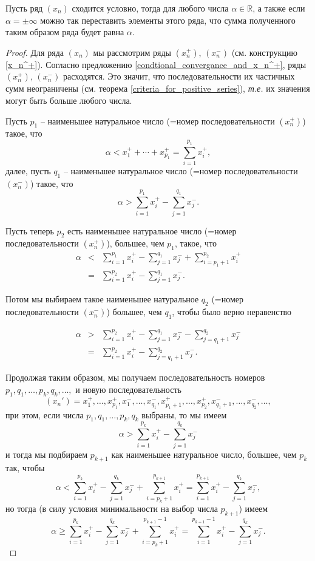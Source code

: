 \begin{theorem}[Риман]
    Пусть ряд $(x_n)$ сходится условно, тогда для любого числа $\alpha \in \mathbb{R}$, а также если $\alpha = \pm \infty$ можно так переставить элементы этого ряда, что сумма полученного таким образом ряда будет равна $\alpha.$
\end{theorem}

\begin{proof}
Для ряда $(x_n)$ мы рассмотрим ряды $(x_n^+)$, $(x_n^-)$ (см. конструкцию \ref{x_n^+}). Согласно предложению \ref{condtional_convergance_and_x_n^+}, ряды $(x_n^+)$, $(x_n^-)$ расходятся. Это значит, что последовательности их частичных сумм неограничены (см. теорема \ref{criteria_for_positive_series}), \textit{т.е.} их значения могут быть больше любого числа. 
    
Пусть $p_1$ -- наименьшее натуральное число (=номер последовательности $(x_n^+)$) такое, что
    \[
     \alpha < x_1^+ + \cdots + x_{p_1}^+  = \sum_{i=1}^{p_1}x_i^+,
    \]
далее, пусть $q_1$ -- наименьшее натуральное число (=номер последовательности $(x_n^-)$) такое, что
\[
 \alpha > \sum_{i=1}^{p_1} x_i^+ - \sum_{j=1}^{q_1} x_j^-.
\]

Пусть теперь $p_2$ есть наименьшее натуральное число (=номер последовательности $(x_n^+)$), большее, чем $p_1$, такое, что
\begin{eqnarray*}
  \alpha &<& \sum_{i=1}^{p_1} x_i^+ - \sum_{j=1}^{q_1} x_j^- + \sum_{i={p_1}+1}^{p_2}x_i^+\\
  &=& \sum_{i=1}^{p_2} x_i^+ - \sum_{j=1}^{q_1} x_j^- .    
\end{eqnarray*}

Потом мы выбираем такое наименьшее натуральное $q_2$ (=номер последовательности $(x_n^-)$) большее, чем $q_1$, чтобы было верно неравенство

\begin{eqnarray*}
  \alpha &>& \sum_{i=1}^{p_2} x_i^+ - \sum_{j=1}^{q_1} x_j^- - \sum_{j={q_1}+1}^{q_2}x_j^-\\
  &=&     \sum_{i=1}^{p_2} x_i^+ -  \sum_{j={q_1}+1}^{q_2}x_j^-.
\end{eqnarray*}



Продолжая таким образом, мы получаем последовательность номеров $p_1, q_1,\ldots, p_k,q_k,\ldots,$ и новую последовательность 
\[
 (x_n') = x_1^+, \ldots, x_{p_1}^+, x_1^-, \ldots, x_{q_1}^-, x_{p_1+1}^+, \ldots, x_{p_2}^+, x_{q_1+1}^-, \ldots, x_{q_2}^-, \ldots,
\]
при этом, если числа $p_1,q_1, \ldots, p_k, q_k$ выбраны, то мы имеем
\[
 \alpha > \sum_{i=1}^{p_k} x_i^+ - \sum_{j=1}^{q_k} x_j^-
\]
и тогда мы подбираем $p_{k+1}$ как наименьшее натуральное число, большее, чем $p_k$ так, чтобы
\[
 \alpha < \sum_{i=1}^{p_k}x_i^+ - \sum_{j=1}^{q_k} x_j^- + \sum_{i=p_k+1}^{p_{k+1}} x_i^+ = \sum_{i=1}^{p_{k+1}}x_i^+ - \sum_{j=1}^{q_k}x_j^-,
\]
но тогда (в силу условия минимальности на выбор числа $p_{k+1}$) имеем
\[
 \alpha \ge \sum_{i=1}^{p_k}x_i^+ - \sum_{j=1}^{q_k} x_j^- + \sum_{i=p_k+1}^{p_{k+1}-1} x_i^+ = \sum_{i=1}^{p_{k+1}-1}x_i^+ - \sum_{j=1}^{q_k}x_j^-.
\]


\end{proof}
